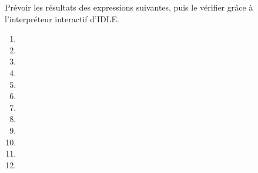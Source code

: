 Prévoir les résultats des expressions suivantes, puis le vérifier grâce à l'interpréteur interactif d'IDLE.

\begin{multicols}{2}
  \begin{enumerate}[label=\emph{\alph*)}]
    \item \pyv{[1,2,3,"a"]}
    \item {}
    \item \pyv{[]}
    \item \pyv{[]+[]}
    \item \pyv{[]+[] == []}
    \item \pyv{[1,2] + [5,7,9]}
    \item \pyv{[0,0]+[0]}
    \item {}
    \item {}
    \item {}
    \item {}
    \item {}
  \end{enumerate}
\end{multicols}